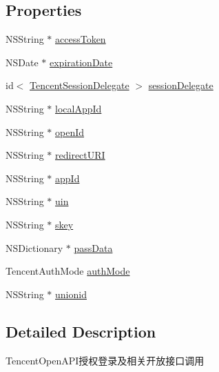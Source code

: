 \subsection*{Properties}
\begin{DoxyCompactItemize}
\item 
N\+S\+String $\ast$ \mbox{\hyperlink{interface_tencent_o_auth_a104b04b7ad6a6e4a3380c79160f087ae}{access\+Token}}
\item 
N\+S\+Date $\ast$ \mbox{\hyperlink{interface_tencent_o_auth_a657d145e7623683b53e172e12ccac100}{expiration\+Date}}
\item 
id$<$ \mbox{\hyperlink{protocol_tencent_session_delegate-p}{Tencent\+Session\+Delegate}} $>$ \mbox{\hyperlink{interface_tencent_o_auth_ade622e98f76e14bfa2351be6450e5784}{session\+Delegate}}
\item 
N\+S\+String $\ast$ \mbox{\hyperlink{interface_tencent_o_auth_a17bf6eb5298ee84fc4707cef5677a360}{local\+App\+Id}}
\item 
N\+S\+String $\ast$ \mbox{\hyperlink{interface_tencent_o_auth_a3f029f8421b8a9fe96a02bd518749f3e}{open\+Id}}
\item 
N\+S\+String $\ast$ \mbox{\hyperlink{interface_tencent_o_auth_ade9a9a825702b104b85b71e6dd00850d}{redirect\+U\+RI}}
\item 
N\+S\+String $\ast$ \mbox{\hyperlink{interface_tencent_o_auth_a6a532ce1ed7f95b82e200c735943cb89}{app\+Id}}
\item 
N\+S\+String $\ast$ \mbox{\hyperlink{interface_tencent_o_auth_a458a807948a610662b8dac4a7964b3cf}{uin}}
\item 
N\+S\+String $\ast$ \mbox{\hyperlink{interface_tencent_o_auth_a9227041b4b5f5e738a9bfae5362703b2}{skey}}
\item 
N\+S\+Dictionary $\ast$ \mbox{\hyperlink{interface_tencent_o_auth_ae601d0d42324cafc1375094367d3d843}{pass\+Data}}
\item 
Tencent\+Auth\+Mode \mbox{\hyperlink{interface_tencent_o_auth_aab1a455b3d77d0a784d10837cd757b19}{auth\+Mode}}
\item 
N\+S\+String $\ast$ \mbox{\hyperlink{interface_tencent_o_auth_a6641fb65b368515918f81edceba6e06e}{unionid}}
\end{DoxyCompactItemize}


\subsection{Detailed Description}
Tencent\+Open\+A\+P\+I授权登录及相关开放接口调用 

